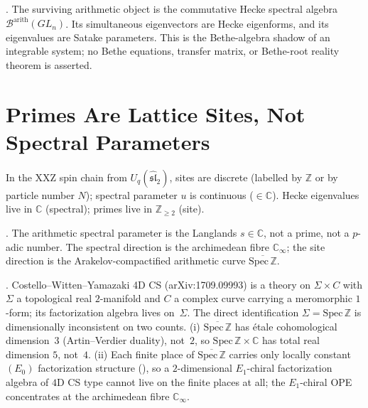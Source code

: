 \begin{theorem}
\label{v4-arith:thm:bethe-placement}
\ClaimStatusProvedHere. The surviving arithmetic object is the
commutative Hecke spectral algebra
\(\mathcal{B}^{\mathrm{arith}}(GL_{n})\). Its simultaneous eigenvectors
are Hecke eigenforms, and its eigenvalues are Satake parameters. This
is the Bethe-algebra shadow of an integrable system; no Bethe
equations, transfer matrix, or Bethe-root reality theorem is asserted.
\end{theorem}

\section{Primes Are Lattice Sites, Not Spectral Parameters}
\label{v4-arith:dr:primes-are-sites}

\begin{principle}
\label{v4-arith:princ:site-spectral}
In the XXZ spin chain from \(U_{q}(\widehat{\mathfrak{sl}}_{2})\),
sites are discrete (labelled by \(\mathbb{Z}\) or by particle number
\(N\)); spectral parameter \(u\) is continuous (\(\in\mathbb{C}\)). Hecke
eigenvalues live in \(\mathbb{C}\) (spectral); primes live in
\(\mathbb{Z}_{\geq 2}\) (site).
\end{principle}

\begin{corollary}
\label{v4-arith:cor:arithmetic-spectral-is-s}
\ClaimStatusProvedHere. The arithmetic spectral parameter is the
Langlands \(s\in\mathbb{C}\), not a prime, not a \(p\)-adic number. The
spectral direction is the archimedean fibre \(\mathbb{C}_{\infty}\);
the site direction is the Arakelov-compactified arithmetic curve
\(\overline{\mathrm{Spec}\,\mathbb{Z}}\).
\end{corollary}

\begin{heuristic}
\label{v4-arith:heur:4dcs-analogy-conditional}
\ClaimStatusHeuristic. Costello--Witten--Yamazaki 4D CS
(arXiv:1709.09993) is a theory on \(\Sigma\times C\) with \(\Sigma\) a
topological real \(2\)-manifold and \(C\) a complex curve carrying a
meromorphic \(1\)-form; its factorization algebra lives on~\(\Sigma\).
The direct identification \(\Sigma=\mathrm{Spec}\,\mathbb{Z}\) is
dimensionally inconsistent on two counts. (i)
\(\overline{\mathrm{Spec}\,\mathbb{Z}}\) has \'etale cohomological
dimension~\(3\) (Artin--Verdier duality), not~\(2\), so
\(\mathrm{Spec}\,\mathbb{Z}\times\mathbb{C}\) has total real dimension
\(5\), not~\(4\). (ii) Each finite place of
\(\overline{\mathrm{Spec}\,\mathbb{Z}}\) carries only locally constant
\((E_{0})\) factorization structure
(), so a
\(2\)-dimensional \(E_{1}\)-chiral factorization algebra of \(4\)D CS type
cannot live on the finite places at all; the \(E_{1}\)-chiral OPE
concentrates at the archimedean fibre \(\mathbb{C}_{\infty}\).
\end{heuristic}

